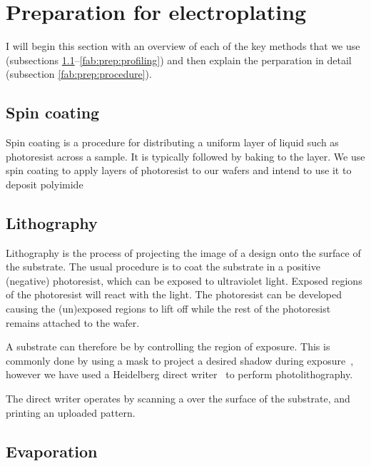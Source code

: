 \section{Preparation for electroplating}
\label{fab:prep}

I will begin this section with an overview of each of the key methods that we
use (subsections \ref{fab:prep:spincoat}--\ref{fab:prep:profiling}) and then
explain the perparation in detail (subsection \ref{fab:prep:procedure}).

\subsection{Spin coating}
\label{fab:prep:spincoat}

Spin coating is a procedure for distributing a uniform layer of liquid such as
photoresist  across a sample. It is typically followed by baking to
 the layer. We use spin coating to apply layers of photoresist to
our wafers and intend to use it to deposit polyimide

\subsection{Lithography}

Lithography is the process of projecting the image of a design onto the surface
of the substrate. The usual procedure is to coat the substrate in a positive
(negative)  photoresist, which can be exposed to ultraviolet
light. Exposed regions of the photoresist will react with the light. The
photoresist can be developed causing the (un)exposed regions to lift off while
the rest of the photoresist remains attached to the wafer.

A substrate can therefore be  by controlling the region of
exposure. This is commonly done by using a mask to project a desired shadow
during exposure~\cite{}, however we have used a Heidelberg direct
writer~\cite{} to perform photolithography.

The direct writer operates by scanning a  over the surface of the
substrate, and printing an uploaded pattern.


\subsection{Evaporation}


